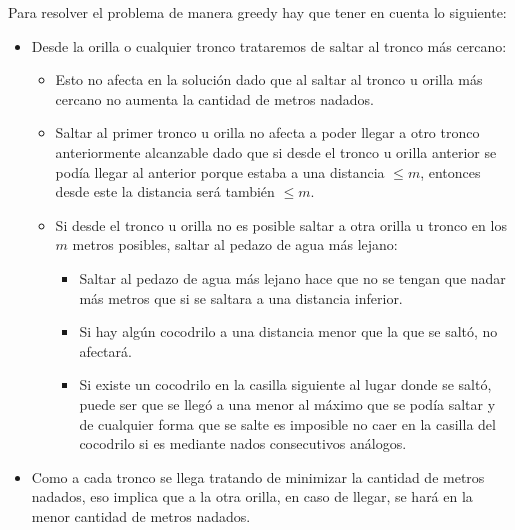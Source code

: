 \documentclass{article}
\begin{document}
Para resolver el problema de manera greedy hay que tener en cuenta lo siguiente:
\begin{itemize}
    \item Desde la orilla o cualquier tronco trataremos de saltar al tronco más cercano:
    \begin{itemize}
        \item Esto no afecta en la solución dado que al saltar al tronco u orilla más cercano no aumenta la cantidad de metros nadados.
        \item Saltar al primer tronco u orilla no afecta a poder llegar a otro tronco anteriormente alcanzable dado que si desde el tronco u orilla anterior se podía llegar al anterior porque estaba a una distancia $\leq m$, entonces desde este la distancia será también $\leq m$.
        \item Si desde el tronco u orilla no es posible saltar a otra orilla u tronco en los $m$ metros posibles, saltar al pedazo de agua más lejano:
        \begin{itemize}
            \item Saltar al pedazo de agua más lejano hace que no se tengan que nadar más metros que si se saltara a una distancia inferior.
            \item Si hay algún cocodrilo a una distancia menor que la que se saltó, no afectará.
            \item Si existe un cocodrilo en la casilla siguiente al lugar donde se saltó, puede ser que se llegó a una menor al máximo que se podía saltar y de cualquier forma que se salte es imposible no caer en la casilla del cocodrilo si es mediante nados consecutivos análogos.
        \end{itemize}
    \end{itemize}
    \item Como a cada tronco se llega tratando de minimizar la cantidad de metros nadados, eso implica que a la otra orilla, en caso de llegar, se hará en la menor cantidad de metros nadados.
\end{itemize}
\end{document}
